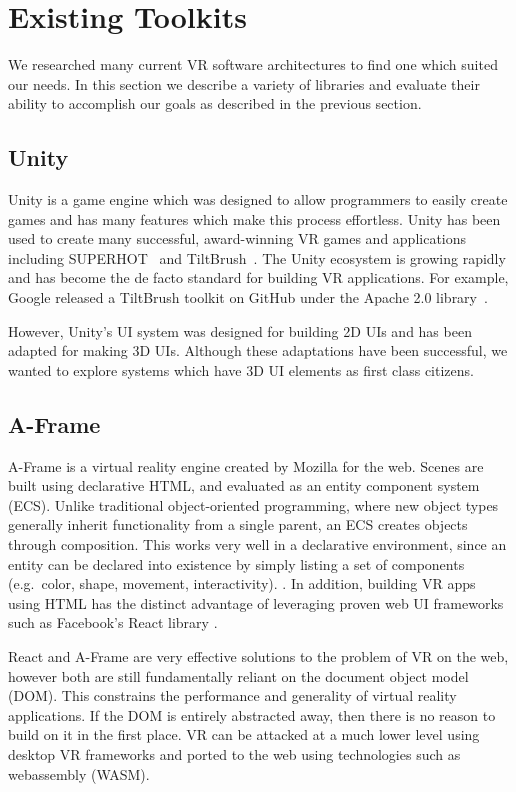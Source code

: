 \documentclass[conference,12pt]{IEEEtran}
\begin{document}
\section{Existing Toolkits}\label{sec:existing_tools}
We researched many current VR software architectures to find one which suited
our needs. In this section we describe a variety of libraries and evaluate their
ability to accomplish our goals as described in the previous section.

\subsection{Unity}\label{sec:unity}
Unity is a game engine which was designed to allow programmers to easily create
games and has many features which make this process effortless. Unity has been
used to create many successful, award-winning VR games and applications
including SUPERHOT~\cite{UploadVR:SUPERHOT} and
TiltBrush~\cite{Unity:TiltBrush}. The Unity ecosystem is growing rapidly and has
become the de facto standard for building VR applications. For example, Google
released a TiltBrush toolkit on GitHub under the Apache 2.0
library~\cite{Google:TiltBrush}.

However, Unity's UI system was designed for building 2D UIs and has been adapted
for making 3D UIs. Although these adaptations have been successful, we wanted to
explore systems which have 3D UI elements as first class citizens.

\subsection{A-Frame}\label{sec:aframe}

A-Frame is a virtual reality engine created by Mozilla for the web. Scenes are
built using declarative HTML, and evaluated as an entity component system (ECS).
Unlike traditional object-oriented programming, where new object types generally
inherit functionality from a single parent, an ECS creates objects through
composition. This works very well in a declarative environment, since an entity
can be declared into existence by simply listing a set of components (e.g.\
color, shape, movement, interactivity).
\cite{Mozilla-Hacks:2016:Building-A-Frame}. In addition, building VR apps using
HTML has the distinct advantage of leveraging proven web UI frameworks such as
Facebook's React library \cite{Ngo:2017:AFrame:React}.

React and A-Frame are very effective solutions to the problem of VR on the web,
however both are still fundamentally reliant on the document object model (DOM).
This constrains the performance and generality of virtual reality applications.
If the DOM is entirely abstracted away, then there is no reason to build on it
in the first place. VR can be attacked at a much lower level using desktop VR
frameworks and ported to the web using technologies such as webassembly (WASM).
\end{document}
